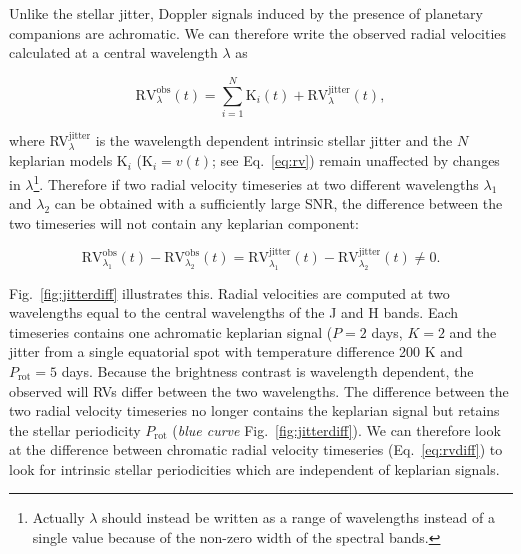 Unlike the stellar jitter, Doppler signals induced by the presence of planetary companions are 
achromatic. We can therefore write the observed radial velocities calculated at a central wavelength 
$\lambda$ as 

\begin{equation}
\mathrm{RV}_{\lambda}^{\mathrm{obs}}(t) = \sum_{i=1}^{N} \mathrm{K}_i(t) + 
\mathrm{RV}_{\lambda}^{\mathrm{jitter}}(t), \label{eq:rvtot}
\end{equation}

\noindent where RV$_{\lambda}^{\mathrm{jitter}}$ is the wavelength dependent intrinsic stellar jitter and 
the $N$ keplarian models K$_i$ (K$_i=v(t)$; see Eq.~\ref{eq:rv}) remain unaffected by changes in 
$\lambda$\footnote{Actually $\lambda$ should instead be written as a range of wavelengths instead of 
a single value because of the non-zero width of the spectral bands.}. 
Therefore if two radial velocity timeseries at two different wavelengths 
$\lambda_1$ and $\lambda_2$ can be obtained with a sufficiently large SNR, 
the difference between the two timeseries will not contain any keplarian component:

\begin{equation}
\mathrm{RV}_{\lambda_1}^{\mathrm{obs}}(t) - \mathrm{RV}_{\lambda_2}^{\mathrm{obs}}(t) = 
\mathrm{RV}_{\lambda_1}^{\mathrm{jitter}}(t) - \mathrm{RV}_{\lambda_2}^{\mathrm{jitter}}(t) \ne 0. 
\label{eq:rvdiff}
\end{equation}

Fig.~\ref{fig:jitterdiff} illustrates this. Radial velocities are computed at two wavelengths 
equal to the central wavelengths of the J and H bands. Each timeseries contains one 
achromatic keplarian signal ($P=2$ days, $K=2$ \mps{)} and the jitter from a single equatorial spot with  
temperature difference 200 K \parencite{berdyugina05} and $P_{\mathrm{rot}}=5$ days. 
Because the brightness contrast is 
wavelength dependent, the observed will RVs differ between the two wavelengths. The difference 
between the two radial velocity timeseries no longer contains the keplarian signal but 
retains the stellar periodicity $P_{\mathrm{rot}}$ (\emph{blue curve} Fig.~\ref{fig:jitterdiff}). 
We can therefore look at the difference 
between chromatic radial velocity timeseries (Eq.~\ref{eq:rvdiff}) 
to look for intrinsic stellar periodicities which are independent of keplarian signals. \\

